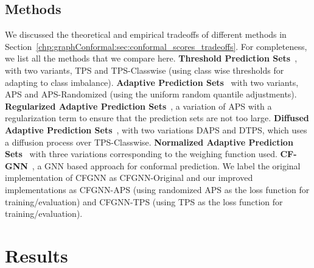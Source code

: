 \subsection{Methods}
We discussed the theoretical and empirical tradeoffs of different methods in Section~\ref{chp:graphConformal:sec:conformal_scores_tradeoffs}.
For completeness, we list all the methods that we compare here.
\textbf{Threshold Prediction Sets}~\cite{sadinle2019least}, with two variants, TPS and TPS-Classwise (using class wise thresholds for adapting to class imbalance).
\textbf{Adaptive Prediction Sets}~\cite{romano2020classification} with two variants, APS and APS-Randomized (using the uniform random quantile adjustments).
\textbf{Regularized Adaptive Prediction Sets}~\cite{angelopoulos2021uncertainty}, a variation of APS with a regularization term to ensure that the prediction sets are not too large.
\textbf{Diffused Adaptive Prediction Sets}~\cite{zargarbashi23conformal}, with two variations DAPS and DTPS, which uses a diffusion process over TPS-Classwise.
\textbf{Normalized Adaptive Prediction Sets}~\cite{clarkson2023distribution} with three variations corresponding to the weighing function used.
\textbf{CF-GNN}~\cite{huang2024uncertainty}, a GNN based approach for conformal prediction. We label the original implementation of CFGNN as CFGNN-Original and our improved implementations as CFGNN-APS (using randomized APS as the loss function for training/evaluation) and CFGNN-TPS (using TPS as the loss function for training/evaluation).


\section{Results}


